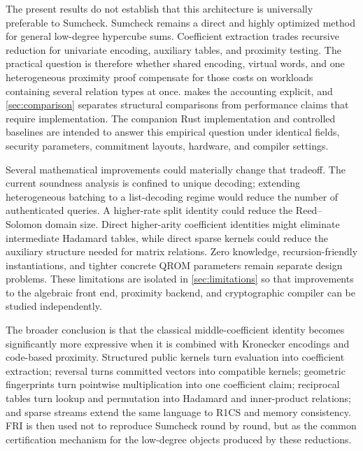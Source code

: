 The present results do not establish that this architecture is universally preferable to Sumcheck.  Sumcheck remains a direct and highly optimized method for general low-degree hypercube sums.  Coefficient extraction trades recursive reduction for univariate encoding, auxiliary tables, and proximity testing.  The practical question is therefore whether shared encoding, virtual words, and one heterogeneous proximity proof compensate for those costs on workloads containing several relation types at once.   makes the accounting explicit, and \cref{sec:comparison} separates structural comparisons from performance claims that require implementation.  The companion Rust implementation and controlled baselines are intended to answer this empirical question under identical fields, security parameters, commitment layouts, hardware, and compiler settings.

Several mathematical improvements could materially change that tradeoff.  The current soundness analysis is confined to unique decoding; extending heterogeneous batching to a list-decoding regime would reduce the number of authenticated queries.  A higher-rate split identity could reduce the Reed--Solomon domain size.  Direct higher-arity coefficient identities might eliminate intermediate Hadamard tables, while direct sparse kernels could reduce the auxiliary structure needed for matrix relations.  Zero knowledge, recursion-friendly instantiations, and tighter concrete QROM parameters remain separate design problems.  These limitations are isolated in \cref{sec:limitations} so that improvements to the algebraic front end, proximity backend, and cryptographic compiler can be studied independently.

The broader conclusion is that the classical middle-coefficient identity becomes significantly more expressive when it is combined with Kronecker encodings and code-based proximity.  Structured public kernels turn evaluation into coefficient extraction; reversal turns committed vectors into compatible kernels; geometric fingerprints turn pointwise multiplication into one coefficient claim; reciprocal tables turn lookup and permutation into Hadamard and inner-product relations; and sparse streams extend the same language to R1CS and memory consistency.  FRI is then used not to reproduce Sumcheck round by round, but as the common certification mechanism for the low-degree objects produced by these reductions.

